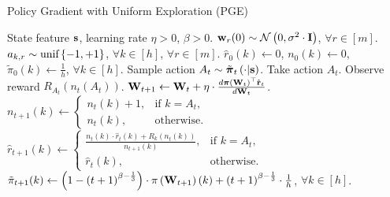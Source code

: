 \documentclass{article}
\begin{document}
\begin{algorithm}[h]
   \caption{Policy Gradient with Uniform Exploration (PGE)}
\label{alg:policy_gradient_uniform_exploration}
\begin{algorithmic}
    State feature ${\mathbf{s}}$, learning rate $\eta > 0$, $\beta > 0$.
   \STATE ${\mathbf{w}}_r(0) \sim {\mathcal{N}}\left( 0, \sigma^2 \cdot {\mathbf{I}} \right)$, $\forall r \in [m]$. $a_{k, r} \sim 
   {\text{unif}}\left\{-1, +1\right\}$, $\forall k \in [h]$, $\forall r \in [m]$.
   \STATE $\hat{r}_{0}(k) \gets 0$, $n_{0}(k) \gets 0$, $\tilde{\pi}_0(k) \gets \frac{1}{h}$, $\forall k \in [h]$.
   \STATE Sample action $A_{t} \sim \tilde{{\boldsymbol{\pi}}}_{t}\left(\cdot \middle| {\mathbf{s}} \right)$. Take action $A_{t}$. Observe reward $R_{ A_{t}}\left(n_{t}\left(A_t\right) \right)$.
   \STATE ${\mathbf{W}}_{t+1} \leftarrow {\mathbf{W}}_t + \eta \cdot \frac{d {\boldsymbol{\pi}}\left({\mathbf{W}}_t\right)^\top \hat{{\mathbf{r}}}_t}{d {\mathbf{W}}_t}$.
   \STATE $n_{t+1}(k) \gets \left. 
		\begin{cases}
		n_{t}(k) + 1, & \text{if } k = A_t, \\
		n_{t}(k), & \text{otherwise}.
		\end{cases}
		\right. \qquad$ 
   $\hat{r}_{t+1}(k) \gets \left. 
		\begin{cases}
		\frac{n_{t}(k) \cdot \hat{r}_{t}(k) + R_{k}\left(n_{t}(k)\right) }{n_{t+1}(k)}, & \text{if } k = A_t, \\
		\hat{r}_{t}(k), & \text{otherwise}.
		\end{cases}
		\right.$
   \STATE $\tilde{\pi}_{t+1}(k) \gets \left( 1 - \left(t+1\right)^{ \beta - \frac{1}{3}} \right) \cdot \pi\left({\mathbf{W}}_{t+1}\right)(k) + \left(t+1\right)^{ \beta - \frac{1}{3}} \cdot \frac{1}{h}$, $\forall k \in [h]$.
   \ENDFOR
\end{algorithmic}
\end{algorithm}
\end{document}

